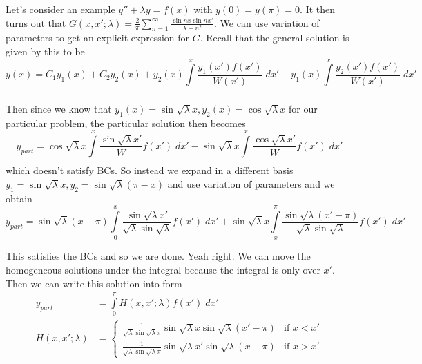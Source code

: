 \documentclass[10pt]{report}
\begin{document}
Let's consider an example $y'' + \lambda y = f(x)$ with $y(0) = y(\pi) = 0$. It then turns out that $G(x,x'; \lambda) = \frac{2}{\pi}\sum_{n=1}^{\infty}\frac{\sin nx \sin nx'}{\lambda - n^2}$. We can use variation of parameters to get an explicit expression for $G$. Recall that the general solution is given by this to be
\begin{equation}
    y(x) = C_1y_1(x) + C_2y_2(x) + y_2(x)\displaystyle\int\limits_{}^{x}\frac{y_1(x')f(x')}{W(x')}\;dx' - y_1(x)\displaystyle\int\limits_{}^{x}\frac{y_2(x')f(x')}{W(x')}\;dx'
\end{equation}

Then since we know that $y_1(x) = \sin \sqrt{\lambda}x, y_2(x) = \cos \sqrt{\lambda}x$ for our particular problem, the particular solution then becomes
\begin{equation}
    y_{part} = \cos \sqrt{\lambda}x \displaystyle\int\limits_{}^{x}\frac{\sin \sqrt{\lambda}x'}{W}f(x')\;dx' - \sin\sqrt{\lambda}x\displaystyle\int\limits_{}^{x}\frac{\cos \sqrt{\lambda}x'}{W}f(x')\;dx'
\end{equation}
which doesn't satisfy BCs. So instead we expand in a different basis $y_1 = \sin \sqrt{\lambda}x, y_2 = \sin \sqrt{\lambda}(\pi - x)$ and use variation of parameters and we obtain
\begin{equation}
    y_{part} = \sin \sqrt{\lambda}(x-\pi)\displaystyle\int\limits_{0}^{x}\frac{\sin \sqrt{\lambda}x'}{\sqrt{\lambda}\sin \sqrt{\lambda}}f(x')\;dx' + \sin \sqrt{\lambda}x \displaystyle\int\limits_{x}^{\pi}\frac{\sin \sqrt{\lambda}(x' - \pi)}{\sqrt{\lambda}\sin \sqrt{\lambda}}f(x')\;dx'
\end{equation}

This satisfies the BCs and so we are done. Yeah right. We can move the homogeneous solutions under the integral because the integral is only over $x'$. Then we can write this solution into form
\begin{align}
    y_{part} &= \displaystyle\int\limits_{0}^{\pi}H(x,x';\lambda)f(x')\;dx'\\
    H(x,x';\lambda) &= 
    \begin{cases}
        \frac{1}{\sqrt{\lambda}\sin \sqrt{\lambda}\pi}\sin \sqrt{\lambda}x \sin \sqrt{\lambda}(x' - \pi) & \mbox{if } x < x'\\
        \frac{1}{\sqrt{\lambda}\sin \sqrt{\lambda}\pi}\sin \sqrt{\lambda}x' \sin \sqrt{\lambda}(x - \pi) & \mbox{if } x > x'
    \end{cases}
\end{align}
\end{document}
